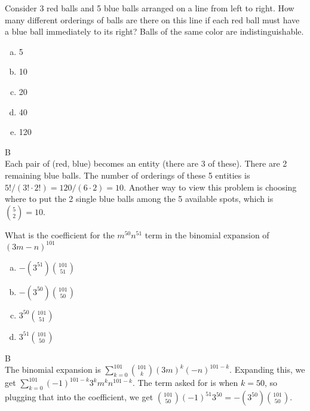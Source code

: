 

Consider 3 red balls and 5 blue balls arranged on a line from left to right. How many different orderings of balls are there on this line if each red ball must have a blue ball immediately to its right? Balls of the same color are indistinguishable.

\begin{enumerate}[(a)]
	\item  5

	\item  10

	\item  20

	\item  40

	\item  120

\end{enumerate}
\begin{solution}

B
\\
Each pair of (red, blue) becomes an entity (there are 3 of these). There are 2 remaining blue balls. The number of orderings of these 5 entities is $5!/(3! \cdot 2!)=120/(6 \cdot 2)=10$. Another way to view this problem is choosing where to put the 2 single blue balls among the 5 available spots, which is $\binom{5}{2} = 10$.

\end{solution}


What is the coefficient for the $m^{50} n^{51}$ term in the binomial expansion of $(3m-n)^{101}$
\begin{enumerate}[(a)]
	\item  $-(3^{51})\binom{101}{51}$ 
    
	\item  $-(3^{50})\binom{101}{50}$
    
	\item  $3^{50}\binom{101}{51}$ 
    
	\item  $3^{51}\binom{101}{50}$  

\end{enumerate}
\begin{solution}

B
\\
The binomial expansion is $\sum_{k=0}^{101}\binom{101}{k}(3m)^{k}(-n)^{101-k}$. Expanding this, we get $\sum_{k=0}^{101}(-1)^{101-k}3^{k}m^kn^{101-k}$. The term asked for is when $k = 50$, so plugging that into the coefficient, we get $\binom{101}{50}(-1)^{51}3^{50} = -(3^{50})\binom{101}{50}$. 

\end{solution}

